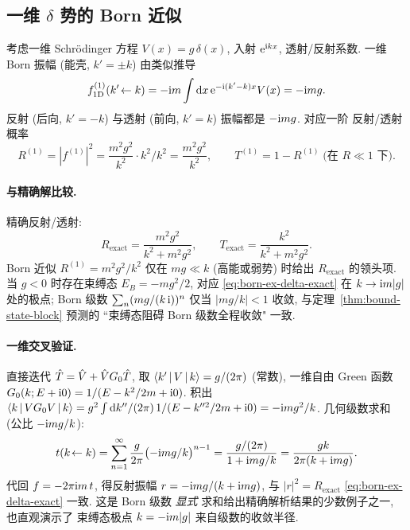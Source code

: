 \subsection{一维 $\delta$ 势的 Born 近似}

考虑一维 Schrödinger 方程 $V(x)=g\,\delta(x)$, 入射 $\mathrm{e}^{\mathrm{i} kx}$,
透射/反射系数. 一维 Born 振幅 (能壳, $k'=\pm k$) 由类似推导
\begin{equation}
f^{(1)}_{1\mathrm D}(k'\!\leftarrow k)=-\mathrm{i} m\int\mathrm{d} x\,\mathrm{e}^{-\mathrm{i}(k'-k)x}V(x)
=-\mathrm{i} m g.
\label{eq:born-ex-delta-f}
\end{equation}
反射 (后向, $k'=-k$) 与透射 (前向, $k'=k$) 振幅都是 $-\mathrm{i} mg$. 对应一阶
反射/透射概率
\begin{equation}
R^{(1)}=|f^{(1)}|^{2}=\frac{m^{2}g^{2}}{k^{2}}\cdot k^{2}/k^{2}=\frac{m^{2}g^{2}}{k^{2}},
\qquad
T^{(1)}=1-R^{(1)} \;\text{(在 }R\ll 1\text{ 下)}.
\label{eq:born-ex-delta-RT}
\end{equation}

\paragraph{与精确解比较.}
精确反射/透射:
\begin{equation}
R_{\text{exact}}=\frac{m^{2}g^{2}}{k^{2}+m^{2}g^{2}},\qquad
T_{\text{exact}}=\frac{k^{2}}{k^{2}+m^{2}g^{2}}.
\label{eq:born-ex-delta-exact}
\end{equation}
Born 近似 $R^{(1)}=m^{2}g^{2}/k^{2}$ 仅在 $mg\ll k$ (高能或弱势) 时给出
$R_{\text{exact}}$ 的领头项. 当 $g<0$ 时存在束缚态 $E_{B}=-mg^{2}/2$,
对应 \eqref{eq:born-ex-delta-exact} 在 $k\to\mathrm{i} m|g|$ 处的极点;
Born 级数 $\sum_{n}(mg/(k\,\mathrm{i}))^{n}$ 仅当 $|mg/k|<1$ 收敛, 与定理~\ref{thm:bound-state-block}
预测的 ``束缚态阻碍 Born 级数全程收敛" 一致.

\paragraph{一维交叉验证.}
直接迭代 $\hat{T}=\hat{V}+\hat{V} G_{0}\hat{T}$, 取 $\left\langle k' \,\middle|\, V \,\middle|\, k \right\rangle=g/(2\pi)$
(常数), 一维自由 Green 函数 $G_{0}(k;E+\mathrm{i} 0)=1/(E-k^{2}/2m+\mathrm{i} 0)$.
积出 $\left\langle k \,\middle|\, V G_{0}V \,\middle|\, k \right\rangle=g^{2}\int\mathrm{d} k''/(2\pi)\,1/(E-k''^{2}/2m+\mathrm{i} 0)
=-\mathrm{i} m g^{2}/k$. 几何级数求和 (公比 $-\mathrm{i} mg/k$):
\begin{equation}
t(k\!\leftarrow k)=\sum_{n=1}^{\infty}\frac{g}{2\pi}\bigl(-\mathrm{i} mg/k\bigr)^{n-1}
=\frac{g/(2\pi)}{1+\mathrm{i} mg/k}=\frac{gk}{2\pi(k+\mathrm{i} mg)}.
\label{eq:born-ex-delta-sum}
\end{equation}
代回 $f=-2\pi\mathrm{i} m\,t$, 得反射振幅 $r=-\mathrm{i} mg/(k+\mathrm{i} mg)$, 与
$|r|^{2}=R_{\text{exact}}$ \eqref{eq:born-ex-delta-exact} 一致. 这是 Born
级数 \emph{显式} 求和给出精确解析结果的少数例子之一, 也直观演示了
束缚态极点 $k=-\mathrm{i} m|g|$ 来自级数的收敛半径.

